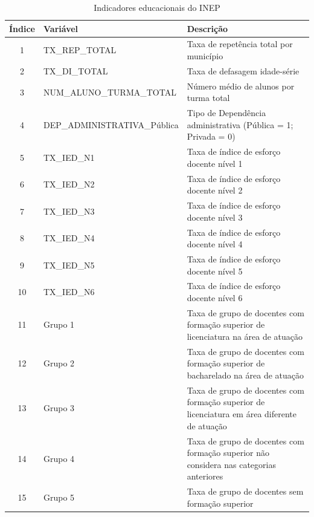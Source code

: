 \documentclass[english, spanish, brazilian]{RBIEarticle} %
\begin{document}
\begin{table}[H]
\centering
\begin{tabular}{clp{7cm}}
\hline
\textbf{Índice} & \textbf{Variável} & \textbf{Descrição} \\ 
\hline
1  & TX\_REP\_TOTAL               & Taxa de repetência total por município  \\
2  & TX\_DI\_TOTAL                & Taxa de defasagem idade-série  \\
3  & NUM\_ALUNO\_TURMA\_TOTAL     & Número médio de alunos por turma total  \\
4  & DEP\_ADMINISTRATIVA\_Pública & Tipo de Dependência administrativa (Pública = 1; Privada = 0)\\
5  & TX\_IED\_N1                   & Taxa de índice de esforço docente nível 1      \\
6  & TX\_IED\_N2                   & Taxa de índice de esforço docente nível 2      \\
7  & TX\_IED\_N3                   & Taxa de índice de esforço docente nível 3      \\
8  & TX\_IED\_N4                   & Taxa de índice de esforço docente nível 4     \\
9  & TX\_IED\_N5                   & Taxa de índice de esforço docente nível 5      \\
10  & TX\_IED\_N6                   & Taxa de índice de esforço docente nível 6     \\
11 & Grupo 1                       & Taxa de grupo de docentes com formação superior de licenciatura na área de atuação      \\
12 & Grupo 2                       & Taxa de grupo de docentes com formação superior de bacharelado na área de atuação     \\
13 & Grupo 3                       & Taxa de grupo de docentes com formação superior de licenciatura em área diferente de atuação      \\
14 & Grupo 4                       & Taxa de grupo de docentes com formação superior não considera nas categorias anteriores     \\
15 & Grupo 5                       & Taxa de grupo de docentes sem formação superior   \\
\hline
\end{tabular}
\caption{Indicadores educacionais do INEP}
\label{tab:ind_inep_desc}
\end{table}
\end{document}
